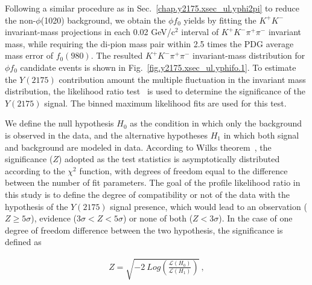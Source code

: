 Following a similar procedure as in Sec.~\ref{chap.y2175.xsec_ul.yphi2pi} to reduce the non-$\phi$(1020) background, we obtain the $\phi f_{0}$ yields by fitting the $K^{+}K^{-}$ invariant-mass projections in each 0.02 GeV/c$^{2}$ interval of $K^{+}K^{-}\pi^{+}\pi^{-}$ invariant mass, while requiring the di-pion mass pair within 2.5 times the PDG average mass error of $f_0(980)$. The resulted $K^{+}K^{-}\pi^{+}\pi^{-}$ invariant-mass distribution for $\phi f_{0}$ candidate events is shown in Fig.~\ref{fig.y2175.xsec_ul.yphifo.1}. To estimate the $Y(2175)$ contribution amount the multiple fluctuation in the invariant mass distribution, the likelihood ratio test~\cite{Cow11} is used to determine the significance of the $Y(2175)$ signal. The binned maximum likelihood fits are used for this test.
~\par We define the null hypothesis $H_{0}$ as the condition in which only the background is observed in the data, and the alternative hypotheses $H_{1}$ in which both signal and background are modeled in data. According to Wilks theorem~\cite{Wil01}, the significance ($Z$) adopted as the test statistics is asymptotically distributed according to the $\chi^{2}$ function, with degrees of freedom equal to the difference between the number of fit parameters. The goal of the profile likelihood ratio in this study is to define the degree of compatibility or not of the data with the hypothesis of the $Y(2175)$ signal presence, which would lead to an observation ($Z \geq 5\sigma$), evidence ($3\sigma < Z < 5\sigma$) or none of both ($Z < 3\sigma$). In the case of one degree of freedom difference between the two hypothesis, the significance is defined as

\begin{equation}
    \label{eq.y2175.xsec_ul.yphifo}
    \begin{aligned}
        Z = \sqrt{-2~Log\left(\frac{\mathcal{L}(H_{0})}{\mathcal{L}(H_{1})}\right)}~,
    \end{aligned}
\end{equation}

